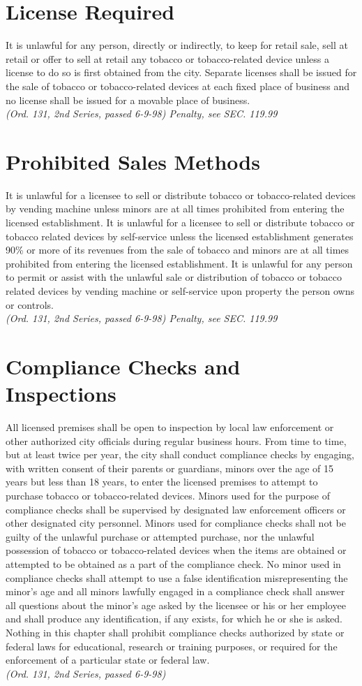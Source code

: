 \section{License Required}
It is unlawful for any person, directly or indirectly, to keep for retail sale, sell at retail or offer to sell at retail any tobacco or tobacco-related device unless a license to do so is first obtained from the city.  Separate licenses shall be issued for the sale of tobacco or tobacco-related devices at each fixed place of business and no license shall be issued for a movable place of business.\\
\emph{(Ord. 131, 2nd Series, passed 6-9-98)  Penalty, see SEC. 119.99}
\section{Prohibited Sales Methods}
It is unlawful for a licensee to sell or distribute tobacco or tobacco-related devices by vending machine unless minors are at all times prohibited from entering the licensed establishment.  It is unlawful for a licensee to sell or distribute tobacco or tobacco related devices by self-service unless the licensed establishment generates 90\% or more of its revenues from the sale of tobacco and minors are at all times prohibited from entering the licensed establishment.  It is unlawful for any person to permit or assist with the unlawful sale or distribution of tobacco or tobacco related devices by vending machine or self-service upon property the person owns or controls.\\
\emph{(Ord. 131, 2nd Series, passed 6-9-98)  Penalty, see SEC. 119.99}
\section{Compliance Checks and Inspections}
All licensed premises shall be open to inspection by local law enforcement or other authorized city officials during regular business hours. From time to time, but at least twice per year, the city shall conduct compliance checks by engaging, with written consent of their parents or guardians, minors over the age of 15 years but less than 18 years, to enter the licensed premises to attempt to purchase tobacco or tobacco-related devices. Minors used for the purpose of compliance checks shall be supervised by designated law enforcement officers or other designated city personnel.  Minors used for compliance checks shall not be guilty of the unlawful purchase or attempted purchase, nor the unlawful possession of tobacco or tobacco-related devices when the items are obtained or attempted to be obtained as a part of the compliance check. No minor used in compliance checks shall attempt to use a false identification misrepresenting the minor’s age and all minors lawfully engaged in a compliance check shall answer all questions about the minor’s age asked by the licensee or his or her employee and shall produce any identification, if any exists, for which he or she is asked.  Nothing in this chapter shall prohibit compliance checks authorized by state or federal laws for educational, research or training purposes, or required for the enforcement of a particular state or federal law.\\
\emph{(Ord. 131, 2nd Series, passed 6-9-98)}
